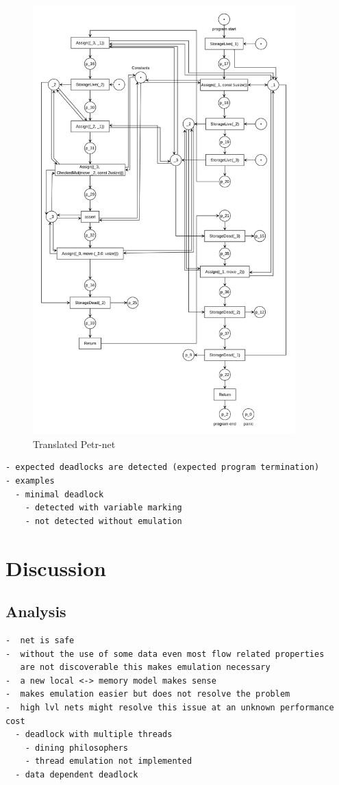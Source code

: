 \begin{figure}
  \centering
  \includegraphics[width=0.9\textwidth]{../diagrams/FunctionCallNet.png}
  \caption{Translated Petr-net}
  \label{function_call_net}
\end{figure}
\begin{verbatim}
- expected deadlocks are detected (expected program termination)
- examples
  - minimal deadlock
    - detected with variable marking
    - not detected without emulation
\end{verbatim}

\section{Discussion}
\subsection{Analysis}
\begin{verbatim}
-  net is safe
-  without the use of some data even most flow related properties
   are not discoverable this makes emulation necessary
-  a new local <-> memory model makes sense
-  makes emulation easier but does not resolve the problem
-  high lvl nets might resolve this issue at an unknown performance cost
  - deadlock with multiple threads
    - dining philosophers
    - thread emulation not implemented
  - data dependent deadlock
\end{verbatim}
  
